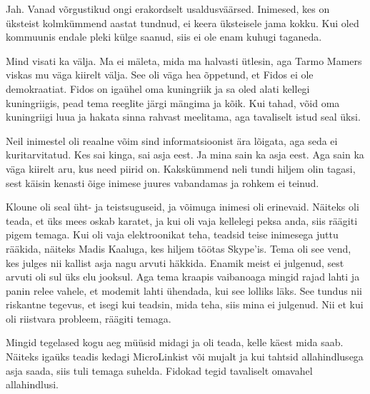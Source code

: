 Jah. Vanad võrgustikud ongi erakordselt usaldusväärsed. Inimesed, kes on üksteist
kolmkümmend aastat tundnud, ei keera üksteisele jama kokku. Kui oled
kommuunis endale pleki külge saanud, siis ei ole enam kuhugi taganeda. 


Mind visati ka välja. Ma ei mäleta, mida ma halvasti ütlesin, aga Tarmo 
Mamers viskas mu väga kiirelt välja. See oli väga 
hea õppetund, et Fidos ei ole demokraatiat. Fidos on igaühel oma kuningriik ja 
sa oled alati kellegi kuningriigis, pead tema reeglite järgi mängima ja 
kõik. Kui tahad, võid oma kuningriigi luua ja hakata sinna rahvast 
meelitama, aga tavaliselt istud seal üksi. 


Neil inimestel oli reaalne võim sind informatsioonist ära lõigata, aga seda 
ei kuritarvitatud. Kes sai kinga, sai asja eest. Ja mina 
sain ka asja eest. Aga sain ka väga kiirelt aru, kus need 
piirid on. Kakskümmend neli tundi hiljem olin tagasi, sest käisin kenasti 
õige inimese juures vabandamas ja rohkem ei teinud. 

Kloune oli seal üht- ja teistsuguseid, ja võimuga inimesi oli erinevaid. Näiteks 
oli teada, et üks mees oskab karatet, ja kui oli vaja kellelegi peksa anda, siis 
räägiti pigem temaga. Kui oli vaja elektroonikat teha, 
teadsid teise inimesega juttu rääkida, näiteks Madis Kaaluga, kes hiljem töötas Skype'is. Tema oli see vend, kes julges nii 
kallist asja nagu arvuti häkkida. Enamik meist ei julgenud, sest arvuti oli 
sul üks elu jooksul. Aga tema kraapis vaibanoaga mingid rajad lahti ja 
panin relee vahele, et modemit lahti ühendada, kui see lolliks läks. See tundus 
nii riskantne tegevus, et isegi kui teadsin, mida teha, siis mina ei julgenud. Nii et
kui oli riistvara probleem, räägiti temaga. 

Mingid tegelased kogu aeg müüsid midagi ja oli teada, kelle käest 
mida saab. Näiteks igaüks teadis kedagi MicroLinkist või mujalt ja kui tahtsid allahindlusega asja 
saada, siis tuli temaga suhelda. Fidokad tegid tavaliselt omavahel 
allahindlusi. 


